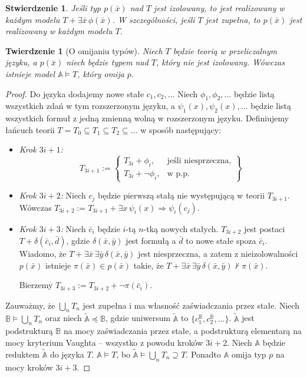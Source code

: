 \documentclass{article}
\newcommand{\A}{\mathbb{A}}
\newcommand{\B}{\mathbb{B}}
\theoremstyle{plain}
\newtheorem{tw}[thm]{Twierdzenie}
\newtheorem{stw}[thm]{Stwierdzenie}
\theoremstyle{definition}
\theoremstyle{remark}
\begin{document}
\begin{stw}
	Jeśli typ $p(\bar{x})$ nad $T$ jest izolowany, to jest realizowany w każdym modelu $T + \exists \bar{x} \, \phi(\bar{x})$.
	W szczególności, jeśli $T$ jest zupełna, to $p(\bar{x})$ jest realizowany w każdym modelu $T$.
\end{stw}

\begin{tw}[O omijaniu typów]
	\label{tw:omi}
	Niech $T$ będzie teorią w przeliczalnym języku, a $p(\bar{x})$ niech będzie typem nad $T$, który nie jest izolowany.
	Wówczas istnieje model $\A \models T$, który omija $p$.
\end{tw}
\begin{proof}
	Do języka dodajemy nowe stałe $c_1, c_2, \ldots$
	Niech $\phi_1, \phi_2, \ldots $ będzie listą wszystkich zdań w tym rozszerzonym języku, a $\psi_1(x), \psi_2(x), \ldots$ będzie listą wszystkich formuł z jedną zmienną wolną w rozszerzonym języku.
	Definiujemy łańcuch teorii $T = T_0 \subseteq T_1 \subseteq T_2 \subseteq \ldots$
	w sposób następujący:
	\begin{itemize}
		\item \textit{Krok $3i+1$:}
			\[
				 T_{3i+1} := \left\{\begin{array}{lr}
						 T_{3i} + \phi_i, & \text{jeśli niesprzeczna,}\\
						 T_{3i} + \neg \phi_i, & \text{w p.p.}
				 \end{array}\right\}
			\]

		\item \textit{Krok $3i+2$:}
			Niech $c_j$ będzie pierwszą stałą nie występującą w teorii $T_{3i+1}$.
			Wówczas $T_{3i+2} := T_{3i+1} + \exists x \, \psi_i(x) \Rightarrow \psi_i(c_j)$.
		\item \textit{Krok $3i+3$:}
			Niech $\bar{c}_i$ będzie $i$-tą $n$-tką nowych stałych.
			$T_{3i+2}$ jest postaci $T + \delta(\bar{c}_i, \bar{d})$, gdzie $\delta(\bar{x}, \bar{y})$ jest formułą a $\bar{d}$ to nowe stałe spoza $\bar{c}_i$.
			Wiadomo, że $T + \exists \bar{x} \, \exists \bar{y} \, \delta(\bar{x}, \bar{y})$ jest niesprzeczna, a zatem z nieizolowalności $p(\bar{x})$ istnieje $\pi(\bar{x}) \in p(\bar{x})$ takie, że $T + \exists \bar{x} \, \exists \bar{y} \, \delta(\bar{x}, \bar{y}) \not \vdash \pi(\bar{x})$.

			Bierzemy $T_{3i+3} := T_{3i+2} + \neg \pi(\bar{c}_i)$.
	\end{itemize}
	Zauważmy, że $\bigcup_n T_n$ jest zupełna i ma własność zaświadczania przez stałe.
	Niech $\B \models \bigcup_n T_n$ oraz niech $\widetilde{\A} \preccurlyeq \B$, gdzie uniwersum $\widetilde{\A}$ to $\{c_1^{\B}, c_2^{\B}, \ldots\}$.
	$\widetilde{\A}$ jest podstrukturą $\B$ na mocy zaświadczania przez stałe, a podstrukturą elementarą na mocy kryterium Vaughta -- wszystko z powodu kroków $3i+2$.
	Niech $\A$ będzie reduktem $\widetilde{\A}$ do języka $T$.
	$\A \models T$, bo $\widetilde{\A} \models \bigcup_n T_n \supseteq T$.
	Ponadto $\A$ omija typ $p$ na mocy kroków $3i+3$.

\end{proof}
\end{document}
